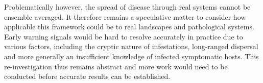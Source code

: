 Problematically however, the spread of disease through real systems cannot be ensemble averaged. %
It therefore remains a speculative matter to consider how applicable this framework could be to %
real landscapes and pathological systems. Early warning signals would be hard to resolve accurately in %
practice due to various factors, including the cryptic nature of infestations, %
long-ranged dispersal and more generally an insufficient knowledge of infected symptomatic hosts. %
This re-investigation thus remains abstract and more work would need to be conducted before %
accurate results can be established. %

\newpage